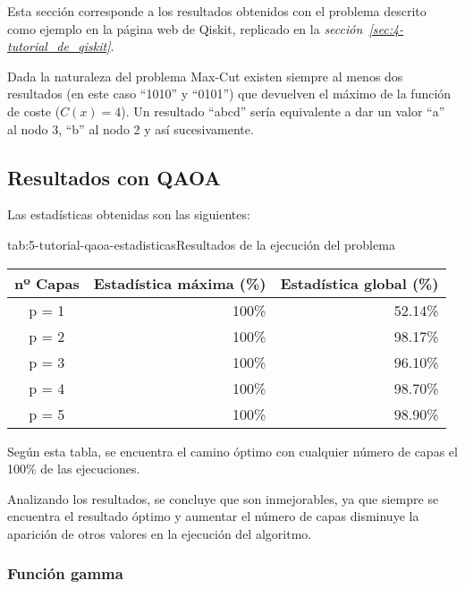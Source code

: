 Esta sección corresponde a los resultados obtenidos con el problema descrito como ejemplo en la página web de Qiskit, replicado en la \textit{sección~\ref{sec:4-tutorial_de_qiskit}}.

Dada la naturaleza del problema Max-Cut existen siempre al menos dos resultados (en este caso ``1010'' y ``0101'') que devuelven el máximo de la función de coste (\(C(x) = 4\)).
Un resultado ``abcd'' sería equivalente a dar un valor ``a'' al nodo 3, ``b'' al nodo 2 y así sucesivamente.

\subsection{Resultados con QAOA}

Las estadísticas obtenidas son las siguientes:

\begin{table}[htbp]{tab:5-tutorial-qaoa-estadisticas}{Resultados de la ejecución del problema~\cite{qiskit_tutorial_antiguo}}
  \begin{tabular}{|c|r|r|}
    \hline
    \textbf{nº Capas} & \textbf{Estadística máxima (\%)} & \textbf{Estadística global (\%)} \\ \hline
    p = 1             & 100\%                            & 52.14\%                          \\ \hline
    p = 2             & 100\%                            & 98.17\%                          \\ \hline
    p = 3             & 100\%                            & 96.10\%                          \\ \hline
    p = 4             & 100\%                            & 98.70\%                          \\ \hline
    p = 5             & 100\%                            & 98.90\%                          \\ \hline
  \end{tabular}
\end{table}

Según esta tabla, se encuentra el camino óptimo con cualquier número de capas el 100\% de las ejecuciones.

Analizando los resultados, se concluye que son inmejorables, ya que siempre se encuentra el resultado óptimo y aumentar el número de capas disminuye la aparición de otros valores en la ejecución del algoritmo.

\subsubsection{Función gamma}

